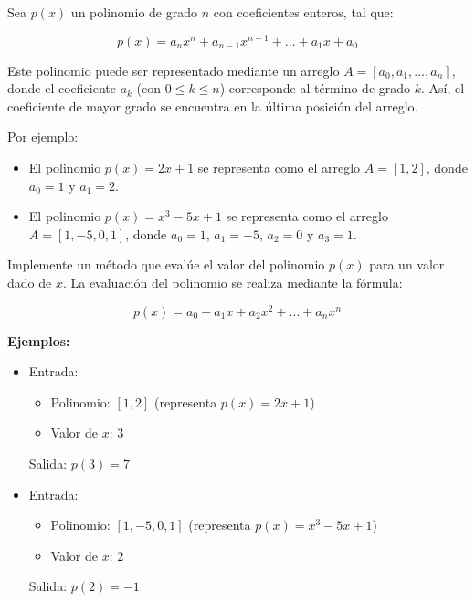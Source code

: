 Sea \( p(x) \) un polinomio de grado \( n \) con coeficientes enteros, tal que:
    
\[
p(x) = a_n x^n + a_{n-1} x^{n-1} + \dots + a_1 x + a_0
\]

Este polinomio puede ser representado mediante un arreglo \( A = [a_0, a_1, \dots, a_n] \), donde el coeficiente \( a_k \) (con \( 0 \leq k \leq n \)) corresponde al término de grado \( k \). Así, el coeficiente de mayor grado se encuentra en la última posición del arreglo.

Por ejemplo:

\begin{itemize}
    \item El polinomio \( p(x) = 2x + 1 \) se representa como el arreglo \( A = [1, 2] \), donde \( a_0 = 1 \) y \( a_1 = 2 \).
    \item El polinomio \( p(x) = x^3 - 5x + 1 \) se representa como el arreglo \( A = [1, -5, 0, 1] \), donde \( a_0 = 1 \), \( a_1 = -5 \), \( a_2 = 0 \) y \( a_3 = 1 \).
\end{itemize}

Implemente un método que evalúe el valor del polinomio \( p(x) \) para un valor dado de \( x \). La evaluación del polinomio se realiza mediante la fórmula:

\[
p(x) = a_0 + a_1 x + a_2 x^2 + \dots + a_n x^n
\]

\textbf{Ejemplos:}
\begin{itemize}
    \item Entrada:
    \begin{itemize}
        \item Polinomio: \([1, 2]\) (representa \(p(x) = 2x + 1\))
        \item Valor de \(x\): \(3\)
    \end{itemize}
    Salida: \( p(3) = 7 \)
    
    \item Entrada:
    \begin{itemize}
        \item Polinomio: \([1, -5, 0, 1]\) (representa \(p(x) = x^3 - 5x + 1\))
        \item Valor de \(x\): \(2\)
    \end{itemize}
    Salida: \( p(2) = -1 \)
\end{itemize}
